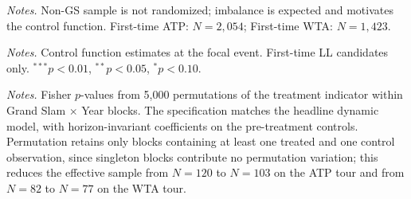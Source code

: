 
\begin{table}[htbp]
\centering
\caption{Pre-Treatment Balance: Non-Grand-Slam (First-LL)}
\label{tab:balance_nongs}
\begin{threeparttable}
\small

\begin{tablenotes}
\footnotesize
\item \textit{Notes.} Non-GS sample is not randomized; imbalance is expected and motivates the control function. First-time ATP: $N = 2{,}054$; First-time WTA: $N = 1{,}423$.
\end{tablenotes}
\end{threeparttable}
\end{table}


\begin{table}[htbp]
\centering
\caption{Non-Grand-Slam Immediate Effects (First-LL, Control Function)}
\label{tab:immediate_nongs}
\begin{threeparttable}
\small

\begin{tablenotes}
\footnotesize
\item \textit{Notes.} Control function estimates at the focal event. First-time LL candidates only. $^{***}p<0.01$, $^{**}p<0.05$, $^{*}p<0.10$.
\end{tablenotes}
\end{threeparttable}
\end{table}


\begin{table}[htbp]
\centering
\caption{Fisher Randomization Inference (First-LL)}
\label{tab:fisher}
\begin{threeparttable}
\small

\begin{tablenotes}
\footnotesize
\item \textit{Notes.} Fisher $p$-values from 5{,}000 permutations of the treatment indicator within Grand Slam $\times$ Year blocks. The specification matches the headline dynamic model, with horizon-invariant coefficients on the pre-treatment controls. Permutation retains only blocks containing at least one treated and one control observation, since singleton blocks contribute no permutation variation; this reduces the effective sample from $N = 120$ to $N = 103$ on the ATP tour and from $N = 82$ to $N = 77$ on the WTA tour.
\end{tablenotes}
\end{threeparttable}
\end{table}

